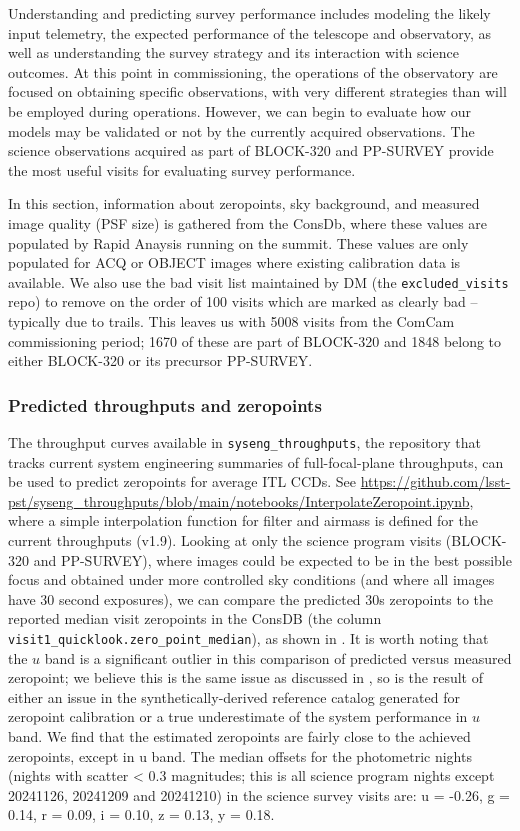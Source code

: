Understanding and predicting survey performance includes modeling the likely input telemetry, the expected performance of the telescope and observatory, as well as understanding the survey strategy and its interaction with science outcomes. At this point in commissioning, the operations of the observatory are focused on obtaining specific observations, with very different strategies than will be employed during operations.  However, we can begin to evaluate how our models may be validated or not by the currently acquired observations. The science observations acquired as part of BLOCK-320  and PP-SURVEY provide the most useful visits for evaluating survey performance. 

In this section, information about zeropoints, sky background, and measured image quality (PSF size) is gathered from the ConsDb, where these values are populated by Rapid Anaysis running on the summit. These values are only populated for ACQ or OBJECT images where existing calibration data is available. We also use the bad visit list maintained by DM (the \texttt{excluded\_visits} repo) to remove on the order of 100 visits which are marked as clearly bad -- typically due to trails. This leaves us with 5008 visits from the ComCam commissioning period; 1670 of these are part of BLOCK-320 and 1848 belong to either BLOCK-320 or its precursor PP-SURVEY.

\subsubsection{Predicted throughputs and zeropoints}

The throughput curves available in \texttt{syseng\_throughputs}, the repository that tracks current system engineering summaries of full-focal-plane throughputs, can be used to predict zeropoints for average ITL CCDs. See \url{https://github.com/lsst-pst/syseng\_throughputs/blob/main/notebooks/InterpolateZeropoint.ipynb}, where a simple interpolation function for filter and airmass is defined for the current throughputs (v1.9).  Looking at only the science program visits (BLOCK-320 and PP-SURVEY), where images could be expected to be in the best possible focus and obtained under more controlled sky conditions (and where all images have 30 second exposures), we can compare the predicted 30s zeropoints to the reported median visit zeropoints in the ConsDB (the column \texttt{visit1\_quicklook.zero\_point\_median}), as shown in . It is worth noting that the $u$ band is a significant outlier in this comparison of predicted versus measured zeropoint; we believe this is the same issue as discussed in , so is the result of either an issue in the synthetically-derived reference catalog generated for zeropoint calibration or a true underestimate of the system performance in $u$ band.  We find that the estimated zeropoints are fairly close to the achieved zeropoints, except in u band. The median offsets for the photometric nights (nights with scatter < 0.3 magnitudes; this is all science program nights except 20241126, 20241209 and 20241210) in the science survey visits are:  u = -0.26, g = 0.14, r = 0.09, i = 0.10, z = 0.13, y = 0.18. 

